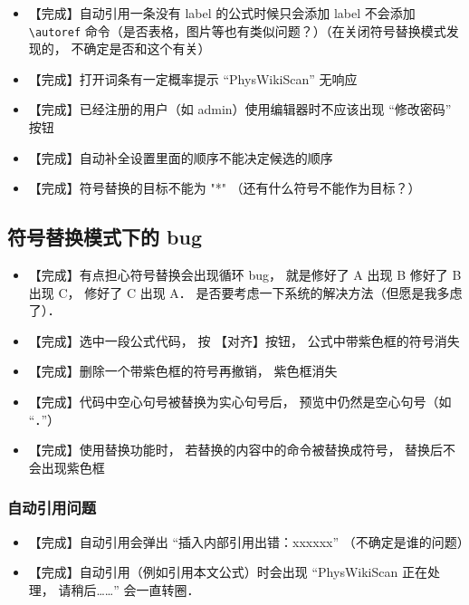 \begin{itemize}
\item 【完成】自动引用一条没有 label 的公式时候只会添加 label 不会添加 \lstinline|\autoref| 命令（是否表格，图片等也有类似问题？）（在关闭符号替换模式发现的， 不确定是否和这个有关）

\item 【完成】打开词条有一定概率提示 “PhysWikiScan” 无响应

\item 【完成】已经注册的用户（如 admin）使用编辑器时不应该出现 “修改密码” 按钮

\item 【完成】自动补全设置里面的顺序不能决定候选的顺序

\item 【完成】符号替换的目标不能为 "*" （还有什么符号不能作为目标？）
\end{itemize}

\subsection{符号替换模式下的 bug}
\begin{itemize}
\item 【完成】有点担心符号替换会出现循环 bug， 就是修好了 A 出现 B 修好了 B 出现 C， 修好了 C 出现 A． 是否要考虑一下系统的解决方法（但愿是我多虑了）．

\item 【完成】选中一段公式代码， 按 【对齐】按钮， 公式中带紫色框的符号消失

\item 【完成】删除一个带紫色框的符号再撤销， 紫色框消失

\item 【完成】代码中空心句号被替换为实心句号后， 预览中仍然是空心句号（如 “．”）

\item 【完成】使用替换功能时， 若替换的内容中的命令被替换成符号， 替换后不会出现紫色框
\end{itemize}

\subsubsection{自动引用问题}
\begin{itemize}
\item 【完成】自动引用会弹出 “插入内部引用出错：xxxxxx” （不确定是谁的问题）
\item 【完成】自动引用（例如引用本文公式）时会出现 “PhysWikiScan 正在处理， 请稍后……” 会一直转圈．
\end{itemize}

